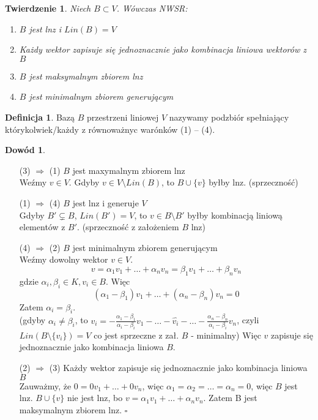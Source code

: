 \documentclass[12pt,a4paper]{article}
\renewcommand{\qed}{$\square$}
\theoremstyle{plain}
\newtheorem{tw}{Twierdzenie}[section]
\theoremstyle{definition}
\theoremstyle{definition}
\newtheorem{df}{Definicja}[section]
\theoremstyle{definition}
\theoremstyle{definition}
\newtheorem*{dd}{Dowód}
\theoremstyle{definition}
\theoremstyle{definition}
\theoremstyle{definition}
\theoremstyle{definition}
\begin{document}
\begin{tw}
  Niech $ B \subset V $. Wówczas NWSR:
  \begin{enumerate}[{(}1{)}]
    \item $ B $ jest lnz i $ Lin(B) = V $
    \item Każdy wektor zapisuje się jednoznacznie jako kombinacja liniowa wektorów z $ B $
    \item $ B $ jest maksymalnym zbiorem lnz
    \item $ B $ jest minimalnym zbiorem generującym
  \end{enumerate}
\end{tw}

\begin{df}
    Bazą $ B $  przestrzeni liniowej $ V $ nazywamy podzbiór spełniający którykolwiek/każdy z równoważnyc warónków (1) -- (4).
\end{df}

\begin{dd} \hfill
    \begin{itemize}
        \item[ (3) $\Rightarrow$ (1) ] $ B $ jest maxymalnym zbiorem lnz\\
            Weźmy $ v \in V $. Gdyby $ v \in V \setminus Lin(B)$, to $ B \cup \{v\}$ byłby lnz. (sprzeczność)
        \item[(1) $\Rightarrow$ (4)] $ B $ jest lnz i generuje $ V $\\
            Gdyby $ B' \subsetneq B$, $ Lin(B') = V $, to $ v \in B \setminus B'$ byłby kombinacją liniową elementów z $ B'$. (sprzeczność z założeniem $B$ lnz)
        \item[(4) $\Rightarrow$ (2)] $ B $ jest minimalnym zbiorem generującym\\
            Weźmy dowolny wektor $ v \in V $. 
            $$ v = \alpha_1v_1 + \dots + \alpha_nv_n = \beta_1v_1 + \dots + \beta_nv_n$$ 
            gdzie $ \alpha_i, \beta_i \in K, v_i \in B$. Więc
            $$ (\alpha_1 - \beta_1)v_1 + \dots + (\alpha_n - \beta_n)v_n = 0 $$
            Zatem $ \alpha_i = \beta_i $. \\
            (gdyby $ \alpha_i \neq \beta_i $, to $ v_i = -\frac{\alpha_1 - \beta_1}{\alpha_i - \beta_i}v_1 - \dots - \hat{v_i} - \dots -\frac{\alpha_n - \beta_n}{\alpha_i - \beta_i}v_n $,
            czyli $ Lin(B \setminus \{v_i\}) = V $ co jest sprzeczne z zał. $ B $ - minimalny)
            Więc $ v $ zapisuje się jednoznacznie jako kombinacja liniowa $ B $.
        \item[(2) $\Rightarrow$ (3)] Każdy wektor zapisuje się jednoznacznie jako kombinacja liniowa $ B $\\
            Zauważmy, że $ 0 = 0 v_1 + \dots + 0 v_n $, więc $ \alpha_1 = \alpha_2 = \dots = \alpha_n = 0 $, więc $ B $ jest lnz.
            $ B \cup \{v\} $ nie jest lnz, bo $ v = \alpha_1v_1 + \dots + \alpha_nv_n$. Zatem B jest maksymalnym zbiorem lnz. \qed

    \end{itemize}
\end{dd}
\end{document}
